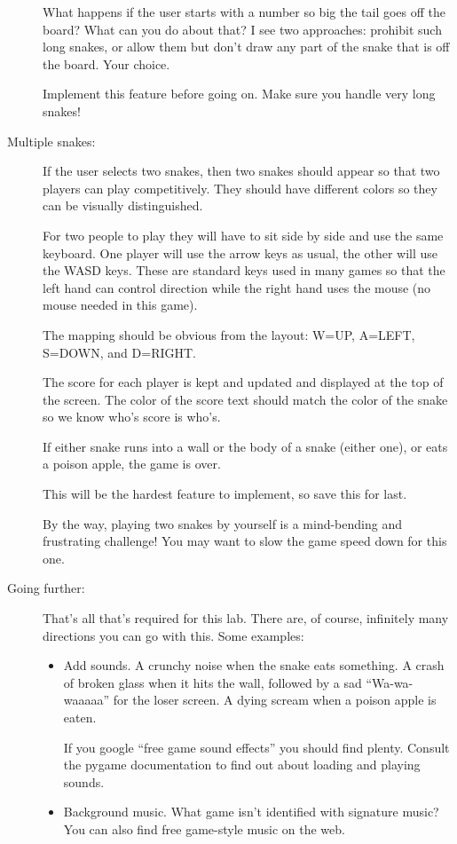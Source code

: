 \documentclass[12pt]{article}
\begin{document}
\begin{description}
What happens if the user starts with a number
so big the tail goes off the board?  What can you do
about that?  I see two approaches:  prohibit such long
snakes, or allow them but don't draw any part of the snake
that is off the board.  Your choice.

Implement this feature before going on.  Make sure you handle
very long snakes!

\item[Multiple snakes:]  If the user selects two snakes,
then two snakes should appear so that two players
can play competitively.  They should have different
colors so they can be visually distinguished.

For two people to play they will have to sit side
by side and use the same keyboard.  One player will
use the arrow keys as usual, the other will use the WASD
keys.  These are standard keys used in many games so that
the left hand can control direction while the right
hand uses the mouse (no mouse needed in this game).

The mapping should be obvious from the layout:  W=UP,
A=LEFT, S=DOWN, and D=RIGHT.

The score for each player is kept and updated and displayed
at the top of the screen.  The color of the score text
should match the color of the snake so we know who's score is who's.

If either snake runs into a wall or the body of a snake
(either one), or eats a poison apple, the game is over.

This will be the hardest feature to implement, so save
this for last.

By the way, playing two snakes by yourself is a mind-bending
and frustrating challenge!  You may want to slow the game
speed down for this one.

\item[Going further:]  That's all that's required for this lab.
There are, of course, infinitely many directions you can go
with this.  Some examples:
\begin{itemize}
\item Add sounds.  A crunchy noise when the snake eats something.
A crash of broken glass when it hits the wall, followed by
a sad ``Wa-wa-waaaaa'' for the loser screen.  A dying scream
when a poison apple is eaten.

If you google ``free game sound effects'' you should find plenty.
Consult the pygame documentation to find out about loading and 
playing sounds.

\item Background music.  What game isn't identified with signature
music?  You can also find free game-style music on the web.


\end{itemize}
\end{description}
\end{document}
